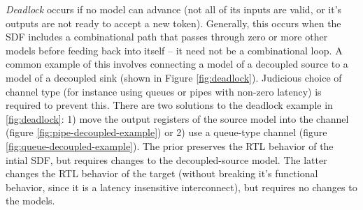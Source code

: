 \emph{Deadlock} occurs if no model can advance (not all of its inputs are
valid, or it's outputs are not ready to accept a new token). Generally, this
occurs when the SDF includes a combinational path that passes through zero or
more other models before feeding back into itself -- it need not be a
combinational loop. A common example of this involves connecting a model of a
decoupled source to a model of a decoupled sink (shown in Figure
\ref{fig:deadlock}). Judicious choice of channel type (for instance using
queues or pipes with non-zero latency) is required to prevent this. There are
two solutions to the deadlock example in \ref{fig:deadlock}: 1) move the output
registers of the source model into the channel (figure \ref{fig:pipe-decoupled-example}) or 2) use a queue-type
channel (figure \ref{fig:queue-decoupled-example}).  The prior preserves the RTL behavior of the intial SDF, but requires
changes to the decoupled-source model.  The latter changes the RTL behavior of
the target (without breaking it's functional behavior, since it is a latency
insensitive interconnect), but requires no changes to the models.


